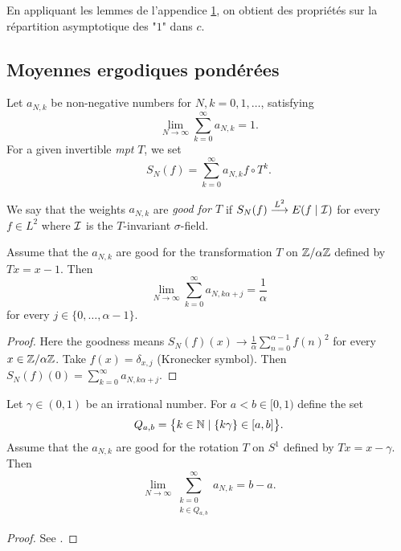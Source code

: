 \documentclass[12pt,a4paper]{article}
\begin{document}
En appliquant les lemmes de l'appendice \ref{sec:HP}, on obtient des 
propriétés sur la répartition asymptotique des "$1$" dans $c$. 


\begin{appendices}

\section{Moyennes ergodiques pondérées}\label{sec:HP}

%

Let $a_{N,k}$ be non-negative numbers for $N,k = 0, 1, \ldots$, satisfying 
$$
\lim_{N \to \infty} \sum_{k=0}^\infty a_{N,k} =1. 
$$
For a given invertible \emph{mpt} $T$, we set
$$
S_N(f) = \sum_{k=0}^\infty a_{N,k} f \circ T^k.
$$

We say that the weights $a_{N,k}$ are \emph{good for $T$} if 
$S_N(f) \overset{L^2}{\longrightarrow} E(f \mid \mathcal{I})$ for every 
$f \in L^2$ where $\mathcal{I}$ is the $T$-invariant $\sigma$-field. 

\begin{lemma}
Assume that the $a_{N,k}$ are good for the transformation 
 $T$ on $\mathbb{Z}/\alpha\mathbb{Z}$ defined by $Tx = x - 1$. Then 
$$
\lim_{N \to \infty} \sum_{k=0}^\infty a_{N,k\alpha+j} = \frac{1}{\alpha}
$$
for every $j \in \{0, \ldots, \alpha-1\}$. 
\end{lemma}

\begin{proof}
Here the goodness means $S_N(f)(x) \to \frac{1}{\alpha} \sum_{n=0}^{\alpha-1} {f(n)}^2$ for 
every $x \in \mathbb{Z}/\alpha\mathbb{Z}$. 
Take $f(x) = \delta_{x,j}$ (Kronecker symbol). 
Then $S_N(f)(0) = \sum_{k=0}^\infty a_{N,k\alpha+j}$.
\end{proof}


\begin{lemma}
Let $\gamma \in (0,1)$ be an irrational number. For $a < b \in [0,1)$ define the set  
$$
Q_{a,b} = \bigl\{k \in \mathbb{N} \mid \{k\gamma\} \in [a,b] \bigr\}.  
$$
Assume that the $a_{N,k}$ are good for the rotation  
 $T$ on $S^1$ defined by $Tx = x - \gamma$. 
 Then 
$$
\lim_{N \to \infty} \sum_{\substack{k=0 \\ k \in Q_{a,b}}}^\infty a_{N,k} = b-a.
$$
\end{lemma}


\begin{proof}
See \cite{HP}.
\end{proof}

\end{appendices}
\end{document}
